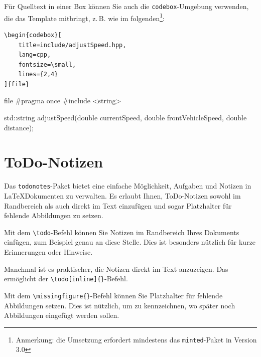 Für Quelltext in einer Box können Sie auch die \texttt{codebox}-Umgebung
verwenden, die das Template mitbringt, z.\,B. wie im
folgenden\footnote{Anmerkung: die Umsetzung erfordert mindestens das
\texttt{minted}-Paket in Version 3.0}:

\begin{verbatim}
\begin{codebox}[
    title=include/adjustSpeed.hpp,
    lang=cpp,
    fontsize=\small,
    lines={2,4}
]{file}
\end{verbatim}

\begin{codebox}[title=include/adjustSpeed.hpp, lang=cpp, font=\small, lines={2,4}]{file}
#pragma once
#include <string>

std::string adjustSpeed(double currentSpeed,
                        double frontVehicleSpeed,
                        double distance);
\end{codebox}



\section{ToDo-Notizen}

Das \texttt{todonotes}-Paket bietet eine einfache Möglichkeit, Aufgaben und
Notizen in \LaTeX\-Dokumenten zu verwalten. Es erlaubt Ihnen, ToDo-Notizen
sowohl im Randbereich als auch direkt im Text einzufügen und sogar Platzhalter
für fehlende Abbildungen zu setzen.

Mit dem \texttt{\textbackslash todo}-Befehl können Sie Notizen im Randbereich
Ihres Dokuments einfügen, zum Beispiel genau an diese Stelle. Dies ist besonders nützlich für kurze Erinnerungen oder
Hinweise.

Manchmal ist es praktischer, die Notizen direkt im Text anzuzeigen. Das
ermöglicht der \texttt{\textbackslash todo[inline]\{\}}-Befehl.


Mit dem \texttt{\textbackslash missingfigure\{\}}-Befehl können Sie Platzhalter
für fehlende Abbildungen setzen. Dies ist nützlich, um zu kennzeichnen, wo
später noch Abbildungen eingefügt werden sollen.

